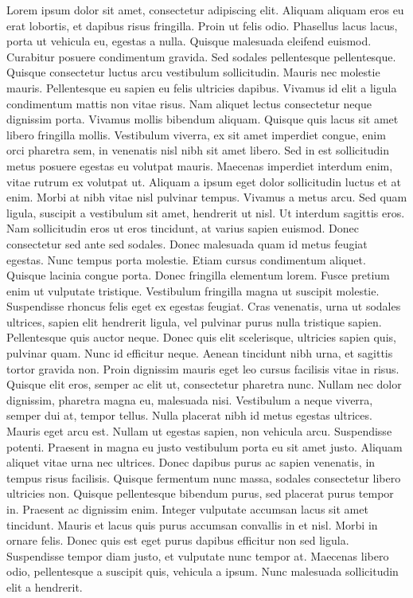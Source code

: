 Lorem ipsum dolor sit amet, consectetur adipiscing elit. Aliquam aliquam eros eu erat lobortis, et dapibus risus fringilla. Proin ut felis odio. Phasellus lacus lacus, porta ut vehicula eu, egestas a nulla. Quisque malesuada eleifend euismod. Curabitur posuere condimentum gravida. Sed sodales pellentesque pellentesque. Quisque consectetur luctus arcu vestibulum sollicitudin. Mauris nec molestie mauris. Pellentesque eu sapien eu felis ultricies dapibus.
Vivamus id elit a ligula condimentum mattis non vitae risus. Nam aliquet lectus consectetur neque dignissim porta. Vivamus mollis bibendum aliquam. Quisque quis lacus sit amet libero fringilla mollis. Vestibulum viverra, ex sit amet imperdiet congue, enim orci pharetra sem, in venenatis nisl nibh sit amet libero. Sed in est sollicitudin metus posuere egestas eu volutpat mauris. Maecenas imperdiet interdum enim, vitae rutrum ex volutpat ut.
Aliquam a ipsum eget dolor sollicitudin luctus et at enim. Morbi at nibh vitae nisl pulvinar tempus. Vivamus a metus arcu. Sed quam ligula, suscipit a vestibulum sit amet, hendrerit ut nisl. Ut interdum sagittis eros. Nam sollicitudin eros ut eros tincidunt, at varius sapien euismod. Donec consectetur sed ante sed sodales.
Donec malesuada quam id metus feugiat egestas. Nunc tempus porta molestie. Etiam cursus condimentum aliquet. Quisque lacinia congue porta. Donec fringilla elementum lorem. Fusce pretium enim ut vulputate tristique. Vestibulum fringilla magna ut suscipit molestie. Suspendisse rhoncus felis eget ex egestas feugiat. Cras venenatis, urna ut sodales ultrices, sapien elit hendrerit ligula, vel pulvinar purus nulla tristique sapien. Pellentesque quis auctor neque. Donec quis elit scelerisque, ultricies sapien quis, pulvinar quam. Nunc id efficitur neque. Aenean tincidunt nibh urna, et sagittis tortor gravida non.
Proin dignissim mauris eget leo cursus facilisis vitae in risus. Quisque elit eros, semper ac elit ut, consectetur pharetra nunc. Nullam nec dolor dignissim, pharetra magna eu, malesuada nisi. Vestibulum a neque viverra, semper dui at, tempor tellus. Nulla placerat nibh id metus egestas ultrices. Mauris eget arcu est. Nullam ut egestas sapien, non vehicula arcu. Suspendisse potenti. Praesent in magna eu justo vestibulum porta eu sit amet justo. Aliquam aliquet vitae urna nec ultrices. Donec dapibus purus ac sapien venenatis, in tempus risus facilisis.
Quisque fermentum nunc massa, sodales consectetur libero ultricies non. Quisque pellentesque bibendum purus, sed placerat purus tempor in. Praesent ac dignissim enim. Integer vulputate accumsan lacus sit amet tincidunt. Mauris et lacus quis purus accumsan convallis in et nisl. Morbi in ornare felis. Donec quis est eget purus dapibus efficitur non sed ligula. Suspendisse tempor diam justo, et vulputate nunc tempor at. Maecenas libero odio, pellentesque a suscipit quis, vehicula a ipsum. Nunc malesuada sollicitudin elit a hendrerit.
